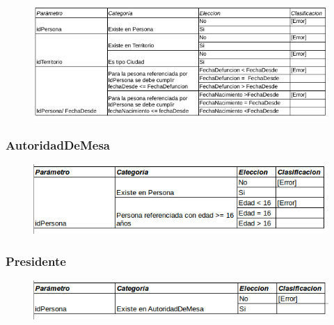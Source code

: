 \begin{figure}[H]
   \begin{center}
   \includegraphics[scale=0.7]{graphics/viveen.png}
   \label{fig:der}
   \end{center}
\end{figure}



\subsubsection{AutoridadDeMesa}

\begin{figure}[H]
   \begin{center}
   \includegraphics[scale=0.7]{graphics/autoridaddemesa.png}
   \label{fig:der}
   \end{center}
\end{figure}



\subsubsection{Presidente}

\begin{figure}[H]
   \begin{center}
   \includegraphics[scale=0.7]{graphics/presidente.png}
   \label{fig:der}
   \end{center}
\end{figure}



